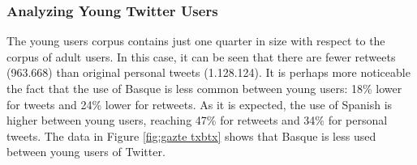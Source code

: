 \documentclass[information,article,submit,moreauthors,pdftex,10pt,a4paper]{Definitions/mdpi}
\begin{document}
\subsubsection{Analyzing Young Twitter Users}

The young users corpus contains just one quarter in size with respect to the corpus of adult users. In this case, it can be seen that there are fewer retweets (963.668) than original personal tweets (1.128.124). It is perhaps more noticeable the fact that the use of Basque is less common between young users: 18\% lower for tweets and 24\% lower for retweets. As it is expected, the use of Spanish is higher between young users, reaching 47\% for retweets and 34\% for personal tweets. The data in Figure \ref{fig:gazte txbtx} shows that Basque is less used between young users of Twitter.
\end{document}
